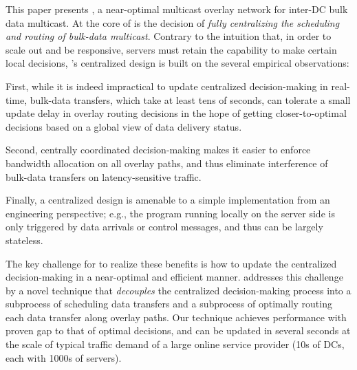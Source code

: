 This paper presents {\em \name}, a near-optimal multicast
overlay network for inter-DC bulk data multicast.
At the core of \name is the decision of {\em fully centralizing
the scheduling and routing of bulk-data multicast}.
Contrary to the intuition that, in order to scale out
and be responsive, servers must retain the capability to make
certain local decisions, \name's centralized design
is built on the several empirical observations:
\begin{packeditemize}
\item First, while it is indeed impractical to update centralized
decision-making in real-time, bulk-data transfers, which take
at least tens of seconds, can tolerate a small update delay in
overlay routing decisions
in the hope of getting closer-to-optimal decisions based on
a global view of data delivery status.
\item Second, centrally coordinated decision-making makes it easier
to enforce bandwidth allocation on all overlay paths,
and thus eliminate interference of bulk-data
transfers on latency-sensitive traffic.
\item Finally, a centralized design is amenable to a simple
implementation from an engineering perspective;
e.g., the program running locally on the server side is
only triggered by data arrivals or control messages, and
thus can be largely stateless.
\end{packeditemize}


The key challenge for \name to realize these benefits is how to
update the centralized decision-making in a near-optimal and
efficient manner.
\name addresses this challenge by a novel technique that
{\em decouples} the centralized decision-making process into a
subprocess of scheduling data transfers and a subprocess of
optimally routing each data transfer along overlay paths.
Our technique achieves performance with proven gap to that of
optimal decisions, and can be updated in several seconds at the
scale of typical traffic demand of a large online service
provider (10s of DCs, each with 1000s of servers).


